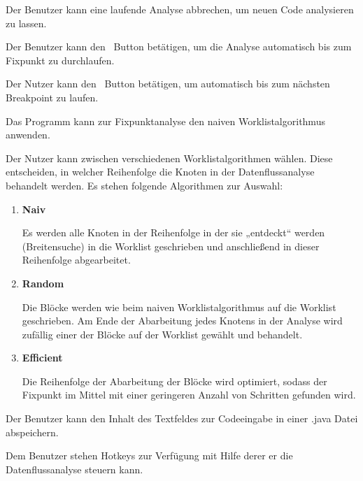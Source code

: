 Der Benutzer kann eine laufende Analyse abbrechen, um neuen Code analysieren zu lassen.

Der Benutzer kann den \faPlay\ Button betätigen, um die Analyse automatisch bis zum Fixpunkt zu durchlaufen.

Der Nutzer kann den \faPlay\ Button betätigen, um automatisch bis zum nächsten Breakpoint zu laufen.

Das Programm kann zur Fixpunktanalyse den naiven Worklistalgorithmus anwenden.

Der Nutzer kann zwischen verschiedenen Worklistalgorithmen wählen. Diese
entscheiden, in welcher Reihenfolge die Knoten in der Datenflussanalyse behandelt
werden. Es stehen folgende Algorithmen zur Auswahl:
\begin{enumerate}[label=(\alph*)]
\item \textbf{Naiv} \par
Es werden alle Knoten in der Reihenfolge in der sie „entdeckt“ werden (Breitensuche) in die Worklist geschrieben und anschließend in dieser Reihenfolge abgearbeitet.
\item \textbf{Random} \par
Die Blöcke werden wie beim naiven Worklistalgorithmus auf die Worklist geschrieben. Am Ende der Abarbeitung jedes Knotens in der Analyse wird zufällig einer der Blöcke auf der Worklist gewählt und behandelt.
\item \textbf{Efficient} \par
Die Reihenfolge der Abarbeitung der Blöcke wird optimiert, sodass der Fixpunkt im Mittel mit einer geringeren Anzahl von Schritten gefunden wird.
\end{enumerate}

Der Benutzer kann den Inhalt des Textfeldes zur Codeeingabe in einer .java Datei abspeichern.

Dem Benutzer stehen Hotkeys zur Verfügung mit Hilfe derer er die Datenflussanalyse steuern kann.

